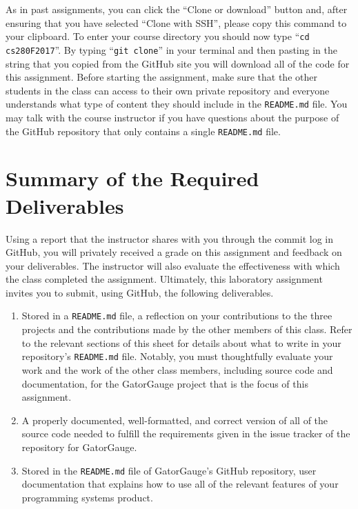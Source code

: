 \documentclass[11pt]{article}
\newcommand{\reflection}{\lstinline{README.md}}
\newcommand{\command}[1]{``\lstinline{#1}''}
\begin{document}
As in past assignments, you can click the ``Clone or download'' button and, after ensuring that you have selected
``Clone with SSH'', please copy this command to your clipboard. To enter your course directory you should now type
\command{cd cs280F2017}. By typing \command{git clone} in your terminal and then pasting in the string that you copied
from the GitHub site you will download all of the code for this assignment. Before starting the assignment, make sure
that the other students in the class can access to their own private repository and everyone understands what type of
content they should include in the \reflection{} file. You may talk with the course instructor if you have questions
about the purpose of the GitHub repository that only contains a single \reflection{} file.

\section*{Summary of the Required Deliverables}

Using a report that the instructor shares with you through the commit log in GitHub, you will privately received a grade
on this assignment and feedback on your deliverables. The instructor will also evaluate the effectiveness with which the
class completed the assignment. Ultimately, this laboratory assignment invites you to submit, using GitHub, the
following deliverables.

\vspace*{-.5em}

\begin{enumerate}

\setlength{\itemsep}{0in}

\item Stored in a \reflection{} file, a reflection on your contributions to the three projects and the contributions
  made by the other members of this class. Refer to the relevant sections of this sheet for details about what to write
  in your repository's \reflection{} file. Notably, you must thoughtfully evaluate your work and the work of the other
  class members, including source code and documentation, for the GatorGauge project that is the focus of this
  assignment.

\item A properly documented, well-formatted, and correct version of all of the source code needed to fulfill the
  requirements given in the issue tracker of the repository for GatorGauge.

\item Stored in the \reflection{} file of GatorGauge's GitHub repository, user documentation that explains how to use
  all of the relevant features of your programming systems product.

\end{enumerate}
\end{document}
